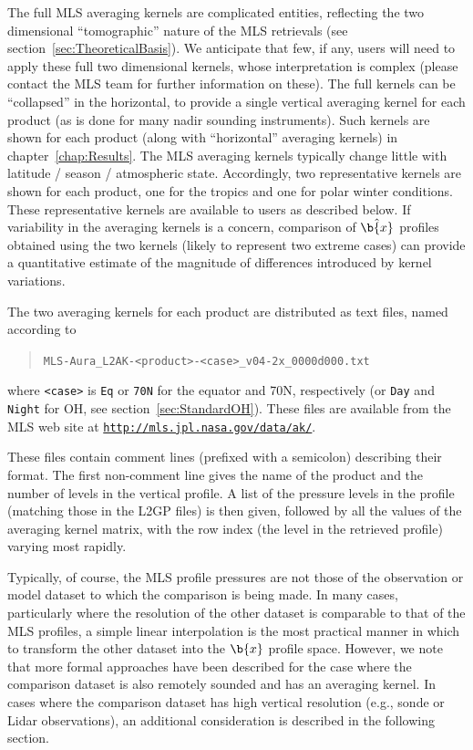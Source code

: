 \documentclass[11pt,draft]{report}
\begin{document}
The full MLS averaging kernels are complicated entities, reflecting the
two dimensional ``tomographic'' nature of the MLS retrievals (see
section~\ref{sec:TheoreticalBasis}).  We anticipate that few, if any,
users will need to apply these full two dimensional kernels, whose
interpretation is complex (please contact the MLS team for further
information on these).  The full kernels can be ``collapsed'' in the
horizontal, to provide a single vertical averaging kernel for each
product (as is done for many nadir sounding instruments).  Such kernels
are shown for each product (along with ``horizontal'' averaging kernels)
in chapter~\ref{chap:Results}.  The MLS averaging kernels typically
change little with latitude / season / atmospheric state.  Accordingly,
two representative kernels are shown for each product, one for the
tropics and one for polar winter conditions.  These representative
kernels are available to users as described below.  If variability in
the averaging kernels is a concern, comparison of $\hat{\b{x}}$ profiles
obtained using the two kernels (likely to represent two extreme cases)
can provide a quantitative estimate of the magnitude of differences
introduced by kernel variations.

The two averaging kernels for each product are distributed as text
files, named according to
\begin{quote}
\verb+MLS-Aura_L2AK-<product>-<case>_v04-2x_0000d000.txt+
\end{quote}
where \verb+<case>+ is \verb+Eq+ or \verb+70N+ for the equator and
70\degsym N, respectively (or \verb+Day+ and \verb+Night+ for OH, see
section~\ref{sec:StandardOH}).  These files are available from the MLS
web site at
\href{http://mls.jpl.nasa.gov/data/ak/}{\texttt{http://mls.jpl.nasa.gov/data/ak/}}.

These files contain comment lines (prefixed with a semicolon) describing
their format.  The first non-comment line gives the name of the product
and the number of levels in the vertical profile.  A list of the
pressure levels in the profile (matching those in the L2GP files) is
then given, followed by all the values of the averaging kernel matrix,
with the row index (the level in the retrieved profile) varying most
rapidly.

Typically, of course, the MLS profile pressures are not those of the
observation or model dataset to which the comparison is being made.  In
many cases, particularly where the resolution of the other dataset is
comparable to that of the MLS profiles, a simple linear interpolation is
the most practical manner in which to transform the other dataset into
the $\b{x}$ profile space.  However, we note that more formal approaches
have been described \citep{RodgersAndConnor03} for the case where the
comparison dataset is also remotely sounded and has an averaging kernel.
In cases where the comparison dataset has high vertical resolution
(e.g., sonde or Lidar observations), an additional consideration is
described in the following section.
\end{document}
